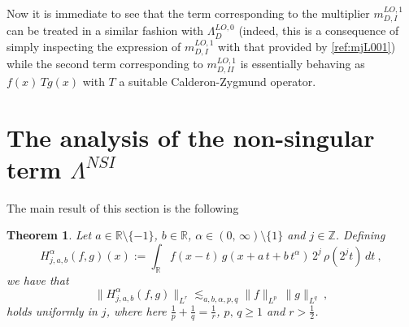 \documentclass[a4paper,reqno]{amsart}
\numberwithin{equation}{section}
\newtheorem{theorem}{Theorem}[section]
\theoremstyle{definition}
\newcommand{\R}{\mathbb{R}}
\newcommand{\Z}{\mathbb{Z}}
\def\a{\alpha}
\def\L{\Lambda}
\begin{document}
Now it is immediate to see that the term corresponding to the multiplier $m_{D,I}^{LO,1}$  can be treated in a similar fashion with $\L_{D}^{LO,0}$ (indeed, this is a consequence of simply inspecting the expression of $m_{D,I}^{LO,1}$ with that provided by \eqref{ref:mjL001}) while the second term corresponding to $m_{D,II}^{LO,1}$ is essentially behaving as $f(x)\,Tg(x)$ with $T$ a suitable Calderon-Zygmund operator.


\section{The analysis of the non-singular term $\L^{NSI}$}\label{NSIterm}


The main result of this section is the following

\begin{theorem}\label{mainsinglsecale} Let $a\in\R\setminus\{-1\}$, $b\in\R$, $\a\in(0,\,\infty)\setminus\{1\}$ and $j\in \Z$. Defining
\begin{equation}\label{bhtj}
H_{j,a,b}^\a(f,g)(x):= \int_\R f(x-t)\, g(x+a\,t+b\,t^\a)\,2^j\,\rho(2^j t)\,dt\:,
\end{equation}
we have that
\begin{equation}\label{mainrmonj}
		\|H_{j,a,b}^\a(f,g)\|_{L^r}\lesssim_{a,b,\a,p,q} \|f\|_{L^p}\,\|g\|_{L^q}\:,
\end{equation}
holds uniformly in $j$, where here $\frac{1}{p}+\frac{1}{q}=\frac{1}{r}$, $p,\,q\geq 1$ and $r>\frac{1}{2}$.
\end{theorem}
\end{document}
